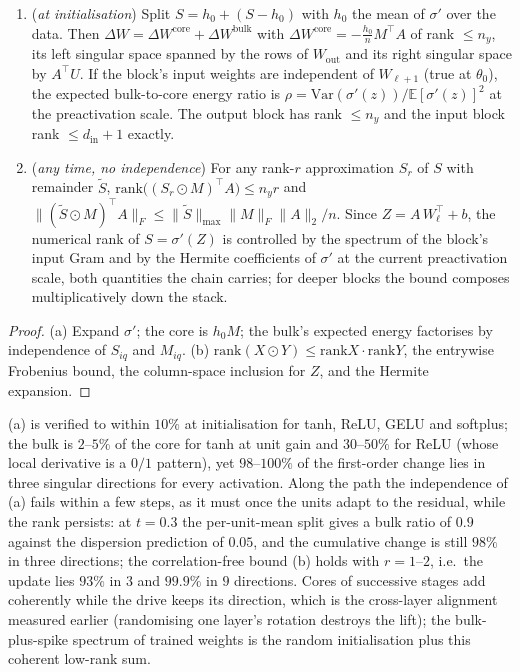 \begin{theorem}
\label{thm:spike}
\begin{enumerate}
\item[(a)] (\emph{at initialisation}) Split $S=h_0+(S-h_0)$ with $h_0$ the mean of
$\sigma'$ over the data. Then $\Delta W=\Delta W^{\mathrm{core}}+\Delta W^{\mathrm{bulk}}$ with
$\Delta W^{\mathrm{core}}=-\frac{h_0}nM^{\!\top}A$ of rank $\le n_y$, its left
singular space spanned by the rows of $W_{\mathrm{out}}$ and its right singular
space by $A^{\!\top}U$. If the block's input weights are independent of
$W_{\ell+1}$ (true at $\theta_0$), the expected bulk-to-core energy ratio is
$\rho=\mathrm{Var}(\sigma'(z))/\mathbb E[\sigma'(z)]^2$ at the preactivation scale.
The output block has rank $\le n_y$ and the input block rank $\le d_{\mathrm{in}}+1$ exactly.
\item[(b)] (\emph{any time, no independence}) For any rank-$r$ approximation
$S_r$ of $S$ with remainder $\tilde S$,
$\mathrm{rank}\big((S_r\odot M)^{\!\top}A\big)\le n_y r$ and
$\|(\tilde S\odot M)^{\!\top}A\|_F\le\|\tilde S\|_{\max}\|M\|_F\|A\|_2/n$. Since
$Z=A\,W_\ell^{\!\top}+b$, the numerical rank of $S=\sigma'(Z)$ is controlled by the
spectrum of the block's input Gram and by the Hermite coefficients of
$\sigma'$ at the current preactivation scale, both quantities the chain
carries; for deeper blocks the bound composes multiplicatively down the stack.
\end{enumerate}
\end{theorem}
\begin{proof}
(a) Expand $\sigma'$; the core is $h_0M$; the bulk's expected energy factorises
by independence of $S_{iq}$ and $M_{iq}$. (b) $\mathrm{rank}(X\odot Y)\le
\mathrm{rank}X\cdot\mathrm{rank}Y$, the entrywise Frobenius bound, the
column-space inclusion for $Z$, and the Hermite expansion.
\end{proof}

\begin{remark}[What was measured, n=200]
(a) is verified to within $10\%$ at initialisation for tanh, ReLU, GELU and
softplus; the bulk is $2$--$5\%$ of the core for tanh at unit gain and
$30$--$50\%$ for ReLU (whose local derivative is a $0/1$ pattern), yet $98$--$100\%$
of the first-order change lies in three singular directions for every
activation. Along the path the independence of (a) fails within a few steps,
as it must once the units adapt to the residual, while the rank persists: at
$t=0.3$ the per-unit-mean split gives a bulk ratio of $0.9$ against the
dispersion prediction of $0.05$, and the cumulative change is still $98\%$ in
three directions; the correlation-free bound (b) holds with $r=1$--$2$, i.e.\
the update lies $93\%$ in $3$ and $99.9\%$ in $9$ directions. Cores of
successive stages add coherently while the drive keeps its direction, which
is the cross-layer alignment measured earlier (randomising one layer's
rotation destroys the lift); the bulk-plus-spike spectrum of trained weights
is the random initialisation plus this coherent low-rank sum.
\end{remark}

